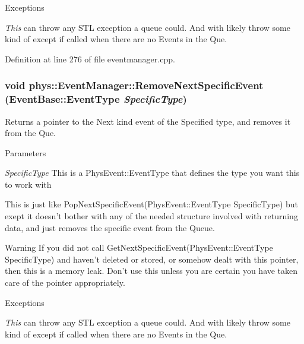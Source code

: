 \begin{DoxyExceptions}{Exceptions}
\item[{\em This}]can throw any STL exception a queue could. And with likely throw some kind of except if called when there are no Events in the Que. \end{DoxyExceptions}


Definition at line 276 of file eventmanager.cpp.

\hypertarget{classphys_1_1EventManager_a486c1173a2c1a64885bfdbe7ca267611}{
\subsubsection[{RemoveNextSpecificEvent}]{\setlength{\rightskip}{0pt plus 5cm}void phys::EventManager::RemoveNextSpecificEvent ({\bf EventBase::EventType} {\em SpecificType})}}
\label{da/dde/classphys_1_1EventManager_a486c1173a2c1a64885bfdbe7ca267611}


Returns a pointer to the Next kind event of the Specified type, and removes it from the Que. 


\begin{DoxyParams}{Parameters}
\item[{\em SpecificType}]This is a PhysEvent::EventType that defines the type you want this to work with\end{DoxyParams}
This is just like PopNextSpecificEvent(PhysEvent::EventType SpecificType) but exept it doesn't bother with any of the needed structure involved with returning data, and just removes the specific event from the Queue. \begin{DoxyWarning}{Warning}
If you did not call GetNextSpecificEvent(PhysEvent::EventType SpecificType) and haven't deleted or stored, or somehow dealt with this pointer, then this is a memory leak. Don't use this unless you are certain you have taken care of the pointer appropriately. 
\end{DoxyWarning}

\begin{DoxyExceptions}{Exceptions}
\item[{\em This}]can throw any STL exception a queue could. And with likely throw some kind of except if called when there are no Events in the Que. \end{DoxyExceptions}



